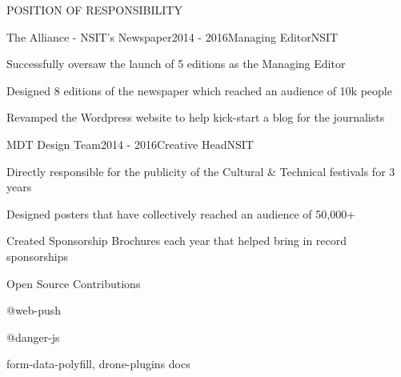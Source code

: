 \documentclass{resume} %
\begin{document}
\begin{rSection}{POSITION OF RESPONSIBILITY}

\begin{rSubsection}{The Alliance - NSIT's Newspaper}{2014 - 2016}{Managing Editor}{NSIT}
\item Successfully oversaw the launch of 5 editions as the Managing Editor
\item Designed 8 editions of the newspaper which reached an audience of 10k people
\item Revamped the Wordpress website to help kick-start a blog for the journalists
\end{rSubsection}


\begin{rSubsection}{MDT Design Team}{2014 - 2016}{Creative Head}{NSIT}
\item Directly responsible for the publicity of the Cultural \& Technical festivals for 3 years
\item Designed posters that have collectively reached an audience of 50,000+
\item Created Sponsorship Brochures each year that helped bring in record sponsorships
\end{rSubsection}

\end{rSection}



\begin{rSection}{Open Source Contributions}
\item @web-push
\item @danger-js
\item form-data-polyfill, drone-plugins docs
\end{rSection}
\end{document}

